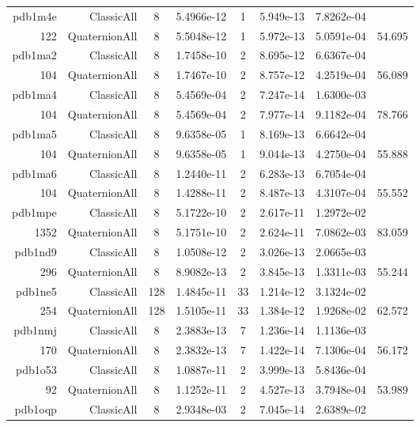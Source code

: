 \begin{xltabular}{\textwidth}{r|rcS[table-format=1.4e+2]cS[table-format=1.3e+2]S[table-format=1.4e+2]S[table-format=-1.3]}
pdb1m4e & ClassicAll & 8 & 5.4966e-12 & 1 & 5.949e-13 & 7.8262e-04 & \\
122 & QuaternionAll & 8 & 5.5048e-12 & 1 & 5.972e-13 & 5.0591e-04 & 54.695\\  \addlinespace
pdb1ma2 & ClassicAll & 8 & 1.7458e-10 & 2 & 8.695e-12 & 6.6367e-04 & \\
104 & QuaternionAll & 8 & 1.7467e-10 & 2 & 8.757e-12 & 4.2519e-04 & 56.089\\  \addlinespace
pdb1ma4 & ClassicAll & 8 & 5.4569e-04 & 2 & 7.247e-14 & 1.6300e-03 & \\
104 & QuaternionAll & 8 & 5.4569e-04 & 2 & 7.977e-14 & 9.1182e-04 & 78.766\\  \addlinespace
pdb1ma5 & ClassicAll & 8 & 9.6358e-05 & 1 & 8.169e-13 & 6.6642e-04 & \\
104 & QuaternionAll & 8 & 9.6358e-05 & 1 & 9.044e-13 & 4.2750e-04 & 55.888\\  \addlinespace
pdb1ma6 & ClassicAll & 8 & 1.2440e-11 & 2 & 6.283e-13 & 6.7054e-04 & \\
104 & QuaternionAll & 8 & 1.4288e-11 & 2 & 8.487e-13 & 4.3107e-04 & 55.552\\  \addlinespace
pdb1mpe & ClassicAll & 8 & 5.1722e-10 & 2 & 2.617e-11 & 1.2972e-02 & \\
1352 & QuaternionAll & 8 & 5.1751e-10 & 2 & 2.624e-11 & 7.0862e-03 & 83.059\\  \addlinespace
pdb1nd9 & ClassicAll & 8 & 1.0508e-12 & 2 & 3.026e-13 & 2.0665e-03 & \\
296 & QuaternionAll & 8 & 8.9082e-13 & 2 & 3.845e-13 & 1.3311e-03 & 55.244\\  \addlinespace
pdb1ne5 & ClassicAll & 128 & 1.4845e-11 & 33 & 1.214e-12 & 3.1324e-02 & \\
254 & QuaternionAll & 128 & 1.5105e-11 & 33 & 1.384e-12 & 1.9268e-02 & 62.572\\  \addlinespace
pdb1nmj & ClassicAll & 8 & 2.3883e-13 & 7 & 1.236e-14 & 1.1136e-03 & \\
170 & QuaternionAll & 8 & 2.3832e-13 & 7 & 1.422e-14 & 7.1306e-04 & 56.172\\  \addlinespace
pdb1o53 & ClassicAll & 8 & 1.0887e-11 & 2 & 3.999e-13 & 5.8436e-04 & \\
92 & QuaternionAll & 8 & 1.1252e-11 & 2 & 4.527e-13 & 3.7948e-04 & 53.989\\  \addlinespace
pdb1oqp & ClassicAll & 8 & 2.9348e-03 & 2 & 7.045e-14 & 2.6389e-02 & \\

\end{xltabular}
